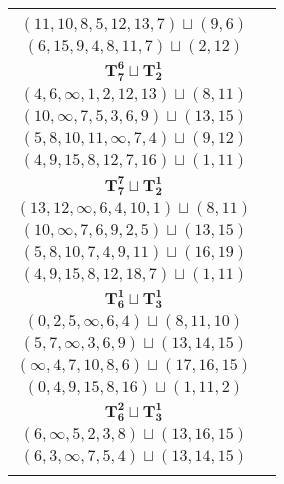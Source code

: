 \documentclass{article}
\begin{document}
\begin{longtable}{|c|c|}
\begin{tabular}{c}
        $(6,7,\infty,10,8,4,5)\sqcup(11,12)$ \\ 
        $(11,10,8,5,12,13,7)\sqcup(9,6)$ \\ 
        $(6,15,9,4,8,11,7)\sqcup(2,12)$
        \end{tabular} \\ 
        \hline
        $\mathbf{T_{7}^{6}} \sqcup \mathbf{T_{2}^{1}}$ & \begin{tabular}{c}
        $(5,4,2,0,1,3,6)\sqcup(9,\infty)$ \\ 
        $(4,6,\infty,1,2,12,13)\sqcup(8,11)$ \\ 
        $(10,\infty,7,5,3,6,9)\sqcup(13,15)$ \\ 
        $(5,8,10,11,\infty,7,4)\sqcup(9,12)$ \\ 
        $(4,9,15,8,12,7,16)\sqcup(1,11)$
        \end{tabular} \\ 
        \hline
        $\mathbf{T_{7}^{7}} \sqcup \mathbf{T_{2}^{1}}$ & \begin{tabular}{c}
        $(5,4,2,3,6,\infty,0)\sqcup(8,7)$ \\ 
        $(13,12,\infty,6,4,10,1)\sqcup(8,11)$ \\ 
        $(10,\infty,7,6,9,2,5)\sqcup(13,15)$ \\ 
        $(5,8,10,7,4,9,11)\sqcup(16,19)$ \\ 
        $(4,9,15,8,12,18,7)\sqcup(1,11)$
        \end{tabular} \\ 
        \hline
        $\mathbf{T_{6}^{1}} \sqcup \mathbf{T_{3}^{1}}$ & \begin{tabular}{c}
        $(3,5,4,2,\infty,1)\sqcup(13,12,15)$ \\ 
        $(0,2,5,\infty,6,4)\sqcup(8,11,10)$ \\ 
        $(5,7,\infty,3,6,9)\sqcup(13,14,15)$ \\ 
        $(\infty,4,7,10,8,6)\sqcup(17,16,15)$ \\ 
        $(0,4,9,15,8,16)\sqcup(1,11,2)$
        \end{tabular} \\ 
        \hline
        $\mathbf{T_{6}^{2}} \sqcup \mathbf{T_{3}^{1}}$ & \begin{tabular}{c}
        $(\infty,2,4,5,8,0)\sqcup(11,13,12)$ \\ 
        $(6,\infty,5,2,3,8)\sqcup(13,16,15)$ \\ 
        $(6,3,\infty,7,5,4)\sqcup(13,14,15)$ \\ 

\end{tabular}
\end{longtable}
\end{document}

